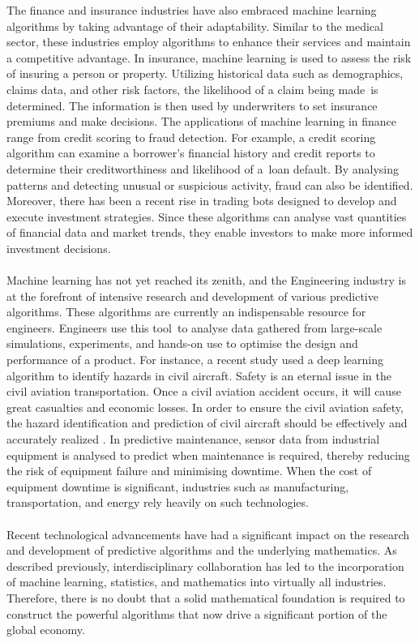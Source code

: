 \documentclass{article}[12pt]
\newcounter{example}[section]
\theoremstyle{definition}
\begin{document}
The finance and insurance industries have also embraced machine learning algorithms by taking advantage of their adaptability. Similar to the medical sector, these industries employ algorithms to enhance their services and maintain a competitive advantage. In insurance, machine learning is used to assess the risk of insuring a person or property. Utilizing historical data such as demographics, claims data, and other risk factors, the likelihood of a claim being made is determined. The information is then used by underwriters to set insurance premiums and make decisions. The applications of machine learning in finance range from credit scoring to fraud detection. For example, a credit scoring algorithm can examine a borrower's financial history and credit reports to determine their creditworthiness and likelihood of a loan default. By analysing patterns and detecting unusual or suspicious activity, fraud can also be identified. Moreover, there has been a recent rise in trading bots designed to develop and execute investment strategies. Since these algorithms can analyse vast quantities of financial data and market trends, they enable investors to make more informed investment decisions.
\\
\\

\noindent
Machine learning has not yet reached its zenith, and the Engineering industry is at the forefront of intensive research and development of various predictive algorithms. These algorithms are currently an indispensable resource for engineers. Engineers use this tool to analyse data gathered from large-scale simulations, experiments, and hands-on use to optimise the design and performance of a product. For instance, a recent study used a deep learning algorithm to identify hazards in civil aircraft. Safety is an eternal issue in the civil aviation transportation. Once a civil aviation accident occurs, it will cause great casualties and economic losses. In order to ensure the civil aviation safety, the hazard identification and prediction of civil aircraft should be effectively and accurately realized \cite{zou}. In predictive maintenance, sensor data from industrial equipment is analysed to predict when maintenance is required, thereby reducing the risk of equipment failure and minimising downtime. When the cost of equipment downtime is significant, industries such as manufacturing, transportation, and energy rely heavily on such technologies.
\\
\\
Recent technological advancements have had a significant impact on the research and development of predictive algorithms and the underlying mathematics. As described previously, interdisciplinary collaboration has led to the incorporation of machine learning, statistics, and mathematics into virtually all industries. Therefore, there is no doubt that a solid mathematical foundation is required to construct the powerful algorithms that now drive a significant portion of the global economy.
\end{document}
